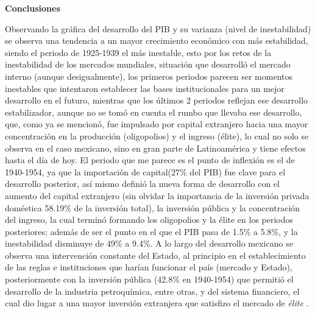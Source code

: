 \textbf{Conclusiones}

Observando la gráfica del desarrollo del PIB y su varianza (nivel de inestabilidad) se observa una tendencia a un mayor crecimiento económico con más estabilidad, siendo el periodo de 1925-1939 el más inestable, esto por los retos de la inestabilidad de los mercados mundiales, situación que desarrolló el mercado interno (aunque desigualmente), los primeros periodos parecen ser momentos inestables que intentaron establecer las bases institucionales para un mejor desarrollo en el futuro, mientras que los últimos 2 periodos reflejan ese desarrollo estabilizador, aunque no se tomó en cuenta el rumbo que llevaba ese desarrollo, que, como ya se mencionó, fue impulsado por capital extranjero hacia una mayor concentración en la producción (oligopolios) y el ingreso (élite), lo cual no solo se observa en el caso mexicano, sino en gran parte de Latinoamérica y tiene efectos hasta el día de hoy.
El periodo que me parece es el punto de inflexión es el de 1940-1954, ya que la importación de capital(27\% del PIB) fue clave para el desarrollo posterior, así mismo definió la nueva forma de desarrollo con el aumento del capital extranjero (sin olvidar la importancia de la inversión privada doméstica 58.19\% de la inversión total), la inversión pública y la concentración del ingreso, la cual terminó formando los oligopolios y la élite en los periodos posteriores; además de ser el punto en el que el PIB pasa de 1.5\% a 5.8\%, y la inestabilidad disminuye de 49\% a 9.4\%.
A lo largo del desarrollo mexicano se observa una intervención constante del Estado, al principio en el establecimiento de las reglas e instituciones que harían funcionar el país (mercado y Estado), posteriormente con la inversión pública (42.8\% en 1940-1954) que permitió el desarrollo de la industria petroquímica, entre otras, y del sistema financiero, el cual dio lugar a una mayor inversión extranjera que satisfizo el mercado de \textit{élite} \cite{PeriodizacionMexico}.